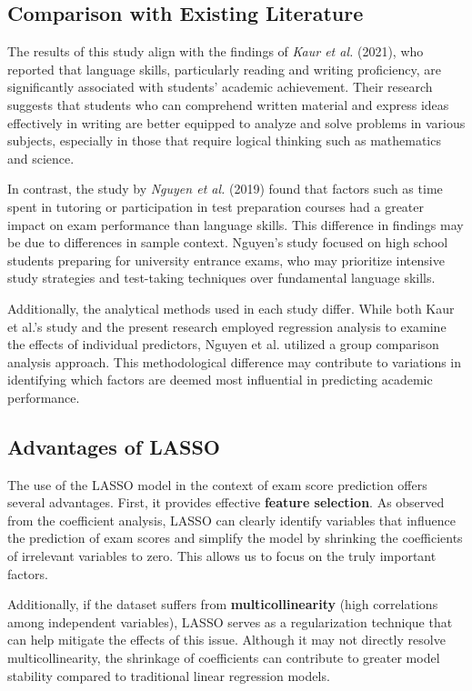 \documentclass[a4paper,12pt]{article}
\begin{document}
	\subsection {Comparison with Existing Literature}

	The results of this study align with the findings of \textit{Kaur et al.} (2021), who reported that language skills, particularly reading and writing proficiency, are significantly associated with students’ academic achievement. Their research suggests that students who can comprehend written material and express ideas effectively in writing are better equipped to analyze and solve problems in various subjects, especially in those that require logical thinking such as mathematics and science.

	In contrast, the study by \textit{Nguyen et al.} (2019) found that factors such as time spent in tutoring or participation in test preparation courses had a greater impact on exam performance than language skills. This difference in findings may be due to differences in sample context. Nguyen's study focused on high school students preparing for university entrance exams, who may prioritize intensive study strategies and test-taking techniques over fundamental language skills.

	Additionally, the analytical methods used in each study differ. While both Kaur et al.’s study and the present research employed regression analysis to examine the effects of individual predictors, Nguyen et al. utilized a group comparison analysis approach. This methodological difference may contribute to variations in identifying which factors are deemed most influential in predicting academic performance.


	\subsection{Advantages of LASSO}
	
	The use of the LASSO model in the context of exam score prediction offers several advantages. First, it provides effective \textbf{feature selection}. As observed from the coefficient analysis, LASSO can clearly identify variables that influence the prediction of exam scores and simplify the model by shrinking the coefficients of irrelevant variables to zero. This allows us to focus on the truly important factors.
	
	Additionally, if the dataset suffers from \textbf{multicollinearity} (high correlations among independent variables), LASSO serves as a regularization technique that can help mitigate the effects of this issue. Although it may not directly resolve multicollinearity, the shrinkage of coefficients can contribute to greater model stability compared to traditional linear regression models.
	
\end{document}
